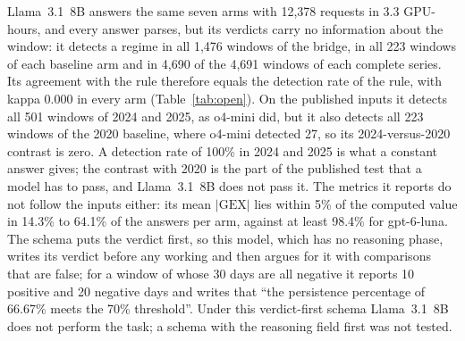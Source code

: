Llama~3.1~8B answers the same seven arms with 12{,}378 requests in 3.3 GPU-hours, and every answer parses, but its verdicts carry no information about the window: it detects a regime in all 1{,}476 windows of the bridge, in all 223 windows of each baseline arm and in 4{,}690 of the 4{,}691 windows of each complete series. Its agreement with the rule therefore equals the detection rate of the rule, with kappa 0.000 in every arm (Table~\ref{tab:open}). On the published inputs it detects all 501 windows of 2024 and 2025, as o4-mini did, but it also detects all 223 windows of the 2020 baseline, where o4-mini detected 27, so its 2024-versus-2020 contrast is zero. A detection rate of 100\% in 2024 and 2025 is what a constant answer gives; the contrast with 2020 is the part of the published test that a model has to pass, and Llama~3.1~8B does not pass it. The metrics it reports do not follow the inputs either: its mean $|\mathrm{GEX}|$ lies within 5\% of the computed value in 14.3\% to 64.1\% of the answers per arm, against at least 98.4\% for gpt-6-luna. The schema puts the verdict first, so this model, which has no reasoning phase, writes its verdict before any working and then argues for it with comparisons that are false; for a window of  whose 30 days are all negative it reports 10 positive and 20 negative days and writes that ``the persistence percentage of 66.67\% meets the 70\% threshold''. Under this verdict-first schema Llama~3.1~8B does not perform the task; a schema with the reasoning field first was not tested.

